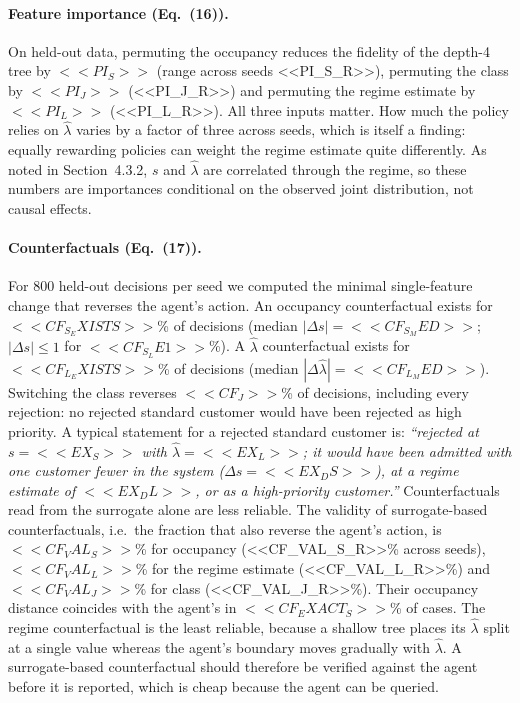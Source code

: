 \paragraph{Feature importance (Eq.~(16)).} On held-out data, permuting the occupancy reduces the fidelity of the depth-4 tree by $<<PI_S>>$ (range across seeds <<PI_S_R>>), permuting the class by $<<PI_J>>$ (<<PI_J_R>>) and permuting the regime estimate by $<<PI_L>>$ (<<PI_L_R>>). All three inputs matter. How much the policy relies on $\hat\lambda$ varies by a factor of three across seeds, which is itself a finding: equally rewarding policies can weight the regime estimate quite differently. As noted in Section~4.3.2, $s$ and $\hat\lambda$ are correlated through the regime, so these numbers are importances conditional on the observed joint distribution, not causal effects.

\paragraph{Counterfactuals (Eq.~(17)).} For 800 held-out decisions per seed we computed the minimal single-feature change that reverses the agent's action. An occupancy counterfactual exists for $<<CF_S_EXISTS>>$\% of decisions (median $|\Delta s|=<<CF_S_MED>>$; $|\Delta s|\le1$ for $<<CF_S_LE1>>$\%). A $\hat\lambda$ counterfactual exists for $<<CF_L_EXISTS>>$\% of decisions (median $|\Delta\hat\lambda|=<<CF_L_MED>>$). Switching the class reverses $<<CF_J>>$\% of decisions, including every rejection: no rejected standard customer would have been rejected as high priority. A typical statement for a rejected standard customer is: \emph{``rejected at $s=<<EX_S>>$ with $\hat\lambda=<<EX_L>>$; it would have been admitted with one customer fewer in the system ($\Delta s=<<EX_DS>>$), at a regime estimate of $<<EX_DL>>$, or as a high-priority customer.''} Counterfactuals read from the surrogate alone are less reliable. The validity of surrogate-based counterfactuals, i.e.\ the fraction that also reverse the agent's action, is $<<CF_VAL_S>>$\% for occupancy (<<CF_VAL_S_R>>\% across seeds), $<<CF_VAL_L>>$\% for the regime estimate (<<CF_VAL_L_R>>\%) and $<<CF_VAL_J>>$\% for class (<<CF_VAL_J_R>>\%). Their occupancy distance coincides with the agent's in $<<CF_EXACT_S>>$\% of cases. The regime counterfactual is the least reliable, because a shallow tree places its $\hat\lambda$ split at a single value whereas the agent's boundary moves gradually with $\hat\lambda$. A surrogate-based counterfactual should therefore be verified against the agent before it is reported, which is cheap because the agent can be queried.

